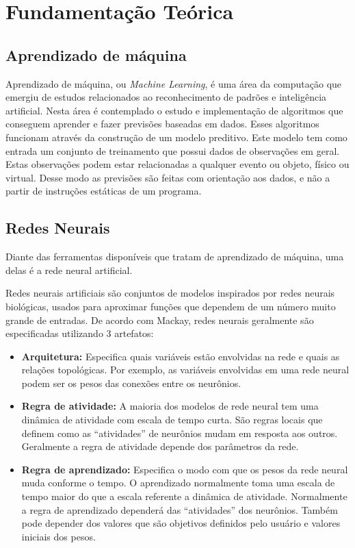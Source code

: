 \chapter{Fundamentação Teórica}

\section{Aprendizado de máquina}

Aprendizado de máquina, ou \textit{Machine Learning}, é uma área da
computação que emergiu de estudos relacionados ao reconhecimento de
padrões e inteligência artificial. Nesta área é contemplado o estudo e
implementação de algoritmos que conseguem aprender e fazer previsões
baseadas em dados. Esses algoritmos funcionam através da construção de
um modelo preditivo. Este modelo tem como entrada um conjunto de
treinamento que possui dados de observações em geral. Estas
observações podem estar relacionadas a qualquer evento ou objeto,
físico ou virtual. Desse modo as previsões são feitas com orientação
aos dados, e não a partir de instruções estáticas de um programa.

\section{Redes Neurais}

Diante das ferramentas disponíveis que tratam de aprendizado de
máquina, uma delas é a rede neural artificial.

Redes neurais artificiais são conjuntos de modelos inspirados por
redes neurais biológicas, usados para aproximar funções que dependem
de um número muito grande de entradas. De acordo com Mackay\cite{Mackay},
redes neurais geralmente são especificadas utilizando 3 artefatos:

\begin{itemize}

\item {\bf Arquitetura:} Especifica quais variáveis estão envolvidas
  na rede e quais as relações topológicas. Por exemplo, as variáveis
  envolvidas em uma rede neural podem ser os pesos das conexões entre
  os neurônios.

\item {\bf Regra de atividade:} A maioria dos modelos de rede neural
  tem uma dinâmica de atividade com escala de tempo curta. São regras
  locais que definem como as ``atividades'' de neurônios mudam em
  resposta aos outros. Geralmente a regra de atividade depende dos
  parâmetros da rede.

\item {\bf Regra de aprendizado:} Especifica o modo com que os pesos
  da rede neural muda conforme o tempo. O aprendizado normalmente toma
  uma escala de tempo maior do que a escala referente a dinâmica de
  atividade. Normalmente a regra de aprendizado dependerá das
  ``atividades'' dos neurônios. Também pode depender dos valores
  que são objetivos definidos pelo usuário e valores iniciais dos
  pesos.

\end{itemize}

